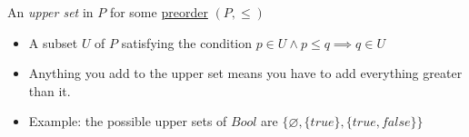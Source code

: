 
An \emph{upper set} in $P$ for some \href{doc/1 math/Seven Sketches in Compositionality/1 Generative Effects/3 Preorders/Preorder}{preorder} $(P, \leq)$

\begin{itemize}
    \item A subset $U$ of $P$ satisfying the condition $p \in U \land p \leq q \implies q \in U$
    \item Anything you add to the upper set means you have to add everything greater than it.
    \item Example: the possible upper sets of $Bool$ are $\{\varnothing, \{true\}, \{true, false\}\}$
  \end{itemize}